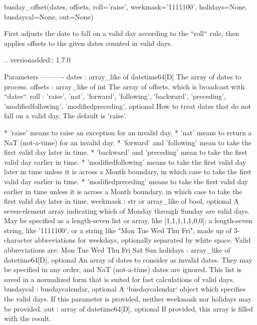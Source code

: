 \begin{DoxyVerb}busday_offset(dates, offsets, roll='raise', weekmask='1111100', holidays=None, busdaycal=None, out=None)

First adjusts the date to fall on a valid day according to
the ``roll`` rule, then applies offsets to the given dates
counted in valid days.

.. versionadded:: 1.7.0

Parameters
----------
dates : array_like of datetime64[D]
    The array of dates to process.
offsets : array_like of int
    The array of offsets, which is broadcast with ``dates``.
roll : {'raise', 'nat', 'forward', 'following', 'backward', 'preceding', 'modifiedfollowing', 'modifiedpreceding'}, optional
    How to treat dates that do not fall on a valid day. The default
    is 'raise'.

      * 'raise' means to raise an exception for an invalid day.
      * 'nat' means to return a NaT (not-a-time) for an invalid day.
      * 'forward' and 'following' mean to take the first valid day
        later in time.
      * 'backward' and 'preceding' mean to take the first valid day
        earlier in time.
      * 'modifiedfollowing' means to take the first valid day
        later in time unless it is across a Month boundary, in which
        case to take the first valid day earlier in time.
      * 'modifiedpreceding' means to take the first valid day
        earlier in time unless it is across a Month boundary, in which
        case to take the first valid day later in time.
weekmask : str or array_like of bool, optional
    A seven-element array indicating which of Monday through Sunday are
    valid days. May be specified as a length-seven list or array, like
    [1,1,1,1,1,0,0]; a length-seven string, like '1111100'; or a string
    like "Mon Tue Wed Thu Fri", made up of 3-character abbreviations for
    weekdays, optionally separated by white space. Valid abbreviations
    are: Mon Tue Wed Thu Fri Sat Sun
holidays : array_like of datetime64[D], optional
    An array of dates to consider as invalid dates.  They may be
    specified in any order, and NaT (not-a-time) dates are ignored.
    This list is saved in a normalized form that is suited for
    fast calculations of valid days.
busdaycal : busdaycalendar, optional
    A `busdaycalendar` object which specifies the valid days. If this
    parameter is provided, neither weekmask nor holidays may be
    provided.
out : array of datetime64[D], optional
    If provided, this array is filled with the result.


\end{DoxyVerb}
